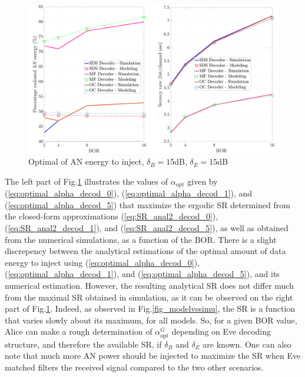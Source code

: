 \documentclass[12pt, draftclsnofoot, onecolumn]{IEEEtran}
\let\MYoriglatexcaption\caption
\renewcommand{\caption}[2][\relax]{\MYoriglatexcaption[#2]{#2}}
\begin{document}
\begin{figure}[h!t]
	\centering
	\includegraphics[width=0.7\linewidth]{graphs/optimal_alpha_15dB.pdf}
	\caption{Optimal of AN energy to inject, $\delta_B = 15$dB,  $\delta_E = 15$dB}
	\label{fig_optimalAN}
\end{figure}
The left part of Fig.\ref{fig_optimalAN} illustrates the values of $\alpha_{\text{opt}}$ given by (\ref{eq:optimal_alpha_decod_0}), (\ref{eq:optimal_alpha_decod_1}), and (\ref{eq:optimal_alpha_decod_5}) that maximize the  ergodic SR determined from the closed-form approximations (\ref{eq:SR_anal2_decod_0}), (\ref{eq:SR_anal2_decod_1}), and (\ref{eq:SR_anal2_decod_5}), as well as obtained from the numerical simulations, as a function of the BOR. There is a slight discrepency between the analytical estimations of the optimal amount of data energy to inject using (\ref{eq:optimal_alpha_decod_0}), (\ref{eq:optimal_alpha_decod_1}), and (\ref{eq:optimal_alpha_decod_5}), and its numerical estimation. However, the resulting analytical SR does not differ much from the maximal SR obtained in simulation, as it can be observed on the right part of Fig.\ref{fig_optimalAN}. Indeed, as observed in Fig.\ref{fig_modelvssimu}, the SR is a function that varies slowly about its maximum, for all models. So, for a given BOR value, Alice can make a rough determination of $\alpha_{\text{opt}}^G$ depending on Eve decoding structure, and therefore the available SR, if $\delta_B$ and $\delta_E$ are known. One can also note that much more AN power should be injected to maximize the SR when Eve matched filters the received signal compared to the two other scenarios.
\end{document}
